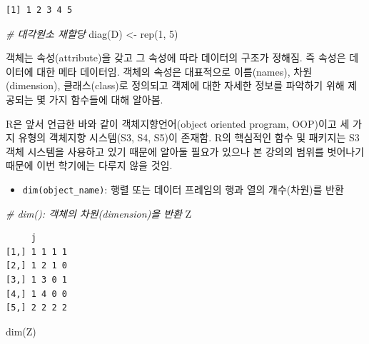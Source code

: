 \documentclass[
  11pt,
]{krantz}
\makeatletter
\newenvironment{Shaded}{\begin{snugshade}}{\end{snugshade}}
\newcommand{\CommentTok}[1]{\textcolor[rgb]{0.37,0.37,0.37}{\textit{#1}}}
\newcommand{\DecValTok}[1]{\textcolor[rgb]{0.06,0.06,0.06}{#1}}
\newcommand{\FunctionTok}[1]{\textcolor[rgb]{0,0,0}{#1}}
\newcommand{\NormalTok}[1]{#1}
\newcommand{\OtherTok}[1]{\textcolor[rgb]{0.37,0.37,0.37}{#1}}
\providecommand{\tightlist}{%
  \setlength{\itemsep}{0pt}\setlength{\parskip}{0pt}}
\newenvironment{kframe}{%
\medskip{}
\setlength{\fboxsep}{.8em}
 \def\at@end@of@kframe{}%
 \ifinner\ifhmode%
  \def\at@end@of@kframe{\end{minipage}}%
  \begin{minipage}{\columnwidth}%
 \fi\fi%
 \def\FrameCommand##1{\hskip\@totalleftmargin \hskip-\fboxsep
 \colorbox{shadecolor}{##1}\hskip-\fboxsep
     \hskip-\linewidth \hskip-\@totalleftmargin \hskip\columnwidth}%
 \MakeFramed {\advance\hsize-\width
   \@totalleftmargin\z@ \linewidth\hsize
   \@setminipage}}%
 {\par\unskip\endMakeFramed%
 \at@end@of@kframe}
\newenvironment{rmdblock}[1]
  {
  \begin{itemize}
  \renewcommand{\labelitemi}{
    \raisebox{-.7\height}[0pt][0pt]{
      {\setkeys{Gin}{width=3em,keepaspectratio}\texttt{[image: images/\#1]}}
    }
  }
  \setlength{\fboxsep}{1em}
  \begin{kframe}
  \item
  }
  {
  \end{kframe}
  \end{itemize}
  }
\newenvironment{rmdnote}
  {\begin{rmdblock}{note}}
  {\end{rmdblock}}
\makeatother
\begin{document}
\begin{verbatim}
[1] 1 2 3 4 5
\end{verbatim}

\begin{Shaded}
\begin{Highlighting}[]
\CommentTok{\# 대각원소 재할당}
\FunctionTok{diag}\NormalTok{(D) }\OtherTok{\textless{}{-}} \FunctionTok{rep}\NormalTok{(}\DecValTok{1}\NormalTok{, }\DecValTok{5}\NormalTok{)}
\end{Highlighting}
\end{Shaded}

\normalsize

\footnotesize

\begin{rmdnote}
객체는 속성(attribute)을 갖고 그 속성에 따라 데이터의 구조가 정해짐. 즉 속성은 데이터에 대한 메타 데이터임. 객체의 속성은 대표적으로 이름(names), 차원(dimension), 클래스(class)로 정의되고 객제에 대한 자세한 정보를 파악하기 위해 제공되는 몇 가지 함수들에 대해 알아봄.

R은 앞서 언급한 바와 같이 객체지향언어(object oriented program, OOP)이고 세 가지 유형의 객체지향 시스템(S3, S4, S5)이 존재함. R의 핵심적인 함수 및 패키지는 S3 객체 시스템을 사용하고 있기 때문에 알아둘 필요가 있으나 본 강의의 범위를 벗어나기 때문에 이번 학기에는 다루지 않을 것임.
\end{rmdnote}

\normalsize

\begin{itemize}
\tightlist
\item
  \texttt{dim(object\_name)}: 행렬 또는 데이터 프레임의 행과 열의 개수(차원)를 반환
\end{itemize}

\footnotesize

\begin{Shaded}
\begin{Highlighting}[]
\CommentTok{\# dim(): 객체의 차원(dimension)을 반환}
\NormalTok{Z}
\end{Highlighting}
\end{Shaded}

\begin{verbatim}
     j      
[1,] 1 1 1 1
[2,] 1 2 1 0
[3,] 1 3 0 1
[4,] 1 4 0 0
[5,] 2 2 2 2
\end{verbatim}

\begin{Shaded}
\begin{Highlighting}[]
\FunctionTok{dim}\NormalTok{(Z)}
\end{Highlighting}
\end{Shaded}
\end{document}
